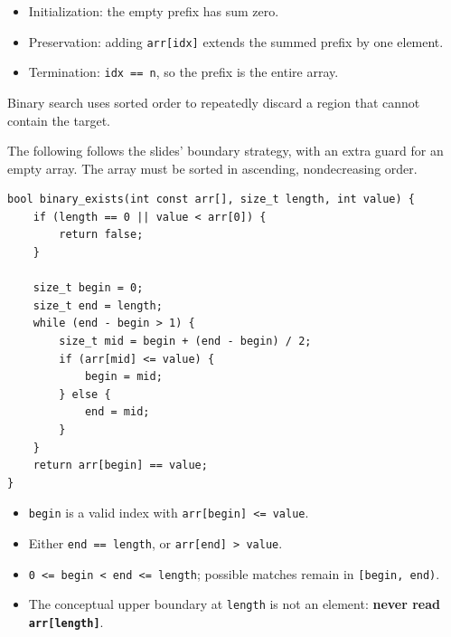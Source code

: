 \documentclass[11pt,a4paper]{article}
\providecommand{\tightlist}{\setlength{\itemsep}{0pt}\setlength{\parskip}{0pt}}
\begin{document}
\begin{itemize}
\tightlist
\item
  Initialization: the empty prefix has sum zero.
\item
  Preservation: adding \texttt{arr{[}idx{]}} extends the summed prefix by one element.
\item
  Termination: \texttt{idx\ ==\ n}, so the prefix is the entire array.
\end{itemize}

\label{binary-search}
\hypertarget{binary-search}{}

Binary search uses sorted order to repeatedly discard a region that cannot contain the target.

The following follows the slides' boundary strategy, with an extra guard for an empty array. The array must be sorted in ascending, nondecreasing order.

\begin{lstlisting}[style=cscode]
bool binary_exists(int const arr[], size_t length, int value) {
    if (length == 0 || value < arr[0]) {
        return false;
    }

    size_t begin = 0;
    size_t end = length;
    while (end - begin > 1) {
        size_t mid = begin + (end - begin) / 2;
        if (arr[mid] <= value) {
            begin = mid;
        } else {
            end = mid;
        }
    }
    return arr[begin] == value;
}
\end{lstlisting}

\label{boundary-meanings}
\hypertarget{boundary-meanings}{}

\begin{itemize}
\tightlist
\item
  \texttt{begin} is a valid index with \texttt{arr{[}begin{]}\ \textless{}=\ value}.
\item
  Either \texttt{end\ ==\ length}, or \texttt{arr{[}end{]}\ \textgreater{}\ value}.
\item
  \texttt{0\ \textless{}=\ begin\ \textless{}\ end\ \textless{}=\ length}; possible matches remain in \texttt{{[}begin,\ end)}.
\item
  The conceptual upper boundary at \texttt{length} is not an element: \textbf{never read \texttt{arr{[}length{]}}}.
\end{itemize}

\label{why-it-works}
\hypertarget{why-it-works}{}
\end{document}
